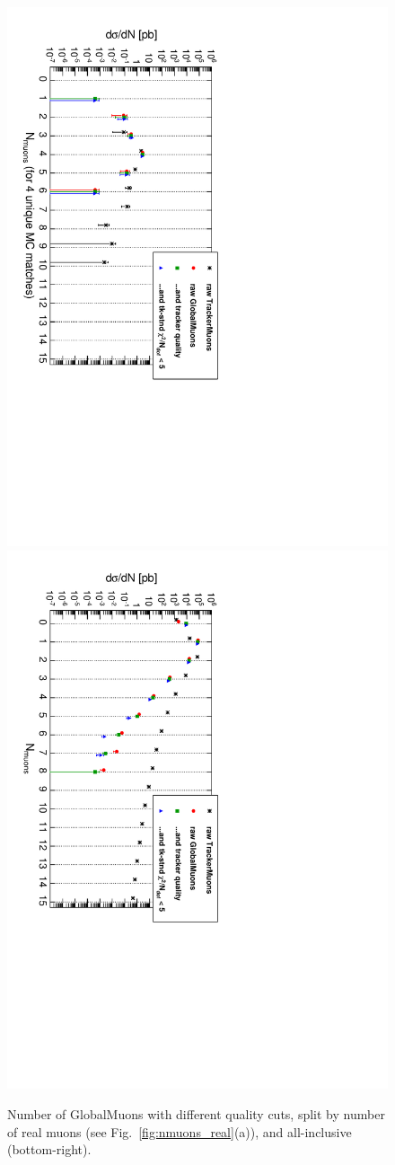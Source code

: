 \documentclass[12pt]{article}
\begin{document}
\begin{figure}[p]
\includegraphics[height=0.5\linewidth, angle=90]{fig/backgroundsMatching_plot/tracks_global_4real.pdf}
\includegraphics[height=0.5\linewidth, angle=90]{fig/backgroundsMatching_plot/tracks_global_allreal.pdf}

\caption{Number of GlobalMuons with different quality cuts, split by number of real muons (see Fig.~\ref{fig:nmuons_real}(a)), and all-inclusive (bottom-right). \label{fig:tracks_global}}
\end{figure}
\end{document}
